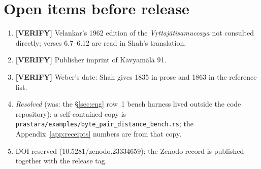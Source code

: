 \documentclass[11pt,letterpaper]{article}
\newcommand{\tagbox}[2]{\textsf{\textbf{\color{#1}#2}}}
\newcommand{\VERIFY}{\tagbox{tagverify}{[VERIFY]}}
\newcommand{\skt}[1]{\textit{#1}}
\newcommand{\code}[1]{\texttt{#1}}
\theoremstyle{plain}
\theoremstyle{remark}
\begin{document}
\section{Open items before release}\label{sec:open}

\begin{enumerate}[label=\arabic*.]
\item \VERIFY{} Velankar's 1962 edition of the \skt{Vṛttajātisamuccaya} not consulted directly; verses 6.7--6.12 are read in Shah's translation.
\item \VERIFY{} Publisher imprint of Kāvyamālā 91.
\item \VERIFY{} Weber's date: Shah gives 1835 in prose and 1863 in the reference list.
\item \emph{Resolved} (was: the §\ref{sec:eng} row~1 bench harness lived outside the code repository): a self-contained copy is \code{prastara/examples/byte\_pair\_distance\_bench.rs}; the Appendix~\ref{app:receipts} numbers are from that copy.
\item DOI reserved (10.5281/zenodo.23334659); the Zenodo record is published together with the release tag.
\end{enumerate}
\end{document}
